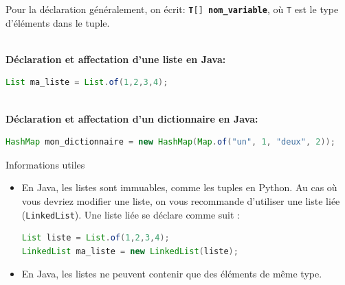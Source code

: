 Pour la déclaration généralement, on écrit: \textbf{\lstinline[language=Java]|T[] nom_variable|}, où \texttt{T} est le type d'éléments dans le tuple.
              
    \textbf{\\ Déclaration et affectation d'une liste en Java:}
    
    \begin{lstlisting}[language=Java]
List ma_liste = List.of(1,2,3,4); \end{lstlisting}
            
    \textbf{\\ Déclaration et affectation d'un dictionnaire en Java:} 
    
    \begin{lstlisting}[language=Java]
HashMap mon_dictionnaire = new HashMap(Map.of("un", 1, "deux", 2)); \end{lstlisting}
              
    
    \begin{Example}{\faTerminal \quad Informations utiles}
        \begin{itemize}
            \item En Java, les listes sont immuables, comme les tuples en Python. Au cas où vous devriez modifier une liste, on vous recommande d'utiliser une liste liée (\lstinline{LinkedList}). Une liste liée se déclare comme suit :
    
            \begin{lstlisting}[language=Java]
List liste = List.of(1,2,3,4);
LinkedList ma_liste = new LinkedList(liste); \end{lstlisting}
            \item En Java, les listes ne peuvent contenir que des éléments de même type.
        \end{itemize} 
        
    \end{Example}
	     
